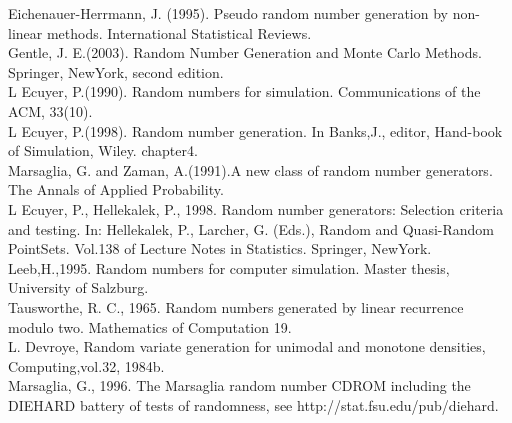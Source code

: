 \documentclass[a4paper,11pt]{article}
\begin{document}
\begin{thebibliography}
 Eichenauer-Herrmann, J. (1995). Pseudo random number generation by non-linear methods. International Statistical Reviews.\\
 Gentle, J. E.(2003). Random Number Generation and Monte Carlo Methods. Springer, NewYork, second edition.\\
 L Ecuyer, P.(1990). Random numbers for simulation. Communications of the ACM, 33(10).\\
 L Ecuyer, P.(1998). Random number generation. In Banks,J., editor, Hand-book of Simulation, Wiley. chapter4.\\
 Marsaglia, G. and Zaman, A.(1991).A new class of random number generators. The Annals of Applied Probability.\\
 L Ecuyer, P., Hellekalek, P., 1998. Random number generators: Selection criteria and testing. In: Hellekalek, P., Larcher, G. (Eds.), Random and Quasi-Random PointSets. Vol.138 of Lecture Notes in Statistics. Springer, NewYork.\\
 Leeb,H.,1995. Random numbers for computer simulation. Master thesis, University of Salzburg.\\
 Tausworthe, R. C., 1965. Random numbers generated by linear recurrence modulo two. Mathematics of Computation 19.\\
 L. Devroye, Random variate generation for unimodal and monotone densities, Computing,vol.32, 1984b.\\
Marsaglia, G., 1996. The Marsaglia random number CDROM including the DIEHARD battery of tests of randomness, see http://stat.fsu.edu/pub/diehard.\\
 
 
 
 
\end{thebibliography}
\end{document}
